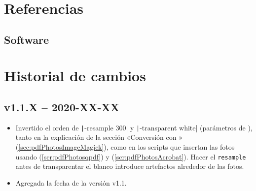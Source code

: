 \documentclass[%
	a5paper,
	10pt,
	twoside,
	openright,
	final,
]{memoir}
\begin{document}
{%
%

\backmatter
\chapter{Referencias}%
\nocite{*}
\setcounter{biburllcpenalty}{9000}
\printbibliography[heading=none, nottype=software]
\section{Software}
\printbibliography[heading=none, type=software]

\cleardoublepage\listoffigures
\cleardoublepage\listoftables
\cleardoublepage\listofscripts

\chapter{Historial de cambios}
	\section{v1.1.X -- 2020-XX-XX}
		\begin{itemize}[noitemsep]
			\item Invertido el orden de \texttt|-resample 300| y \texttt|-transparent white| (parámetros de \imagemagick), tanto en la explicación de la sección «Conversión con \imagemagick» (\ref{sec:pdfPhotosImageMagick}), como en los scripts que insertan las fotos usando \qpdf (\ref{scr:pdfPhotosqpdf}) y \acrobat (\ref{scr:pdfPhotosAcrobat}). Hacer el \texttt{resample} antes de transparentar el blanco introduce artefactos alrededor de las fotos.
			\item Agregada la fecha de la versión v1.1.
		\end{itemize}

}
\end{document}

